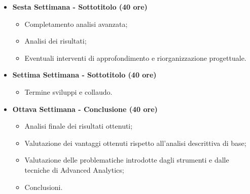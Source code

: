 {\begin{itemize}
\begin{itemize}
        \end{itemize}
        \item \textbf{Sesta Settimana - Sottotitolo (40 ore)} 
        \begin{itemize}
            \item Completamento analisi avanzata;
            \item Analisi dei risultati;
            \item Eventuali interventi di approfondimento e riorganizzazione progettuale.
        \end{itemize}
        \item \textbf{Settima Settimana - Sottotitolo (40 ore)} 
        \begin{itemize}
            \item Termine sviluppi e collaudo.
        \end{itemize}
        \item \textbf{Ottava Settimana - Conclusione (40 ore)} 
        \begin{itemize}
            \item Analisi finale dei risultati ottenuti;
            \item Valutazione dei vantaggi ottenuti rispetto all'analisi descrittiva di base;
            \item Valutazione delle problematiche introdotte dagli strumenti e dalle tecniche di Advanced Analytics;
            \item Conclusioni.
        \end{itemize}
    \end{itemize}
}

\newcommand{\totaleOre}{}

\newcommand{\obiettiviObbligatori}{
	 \item \underline{\textit{O01}}: primo obiettivo;
	 \item \underline{\textit{O02}}: secondo obiettivo;
	 \item \underline{\textit{O03}}: terzo obiettivo;
	 
}

\newcommand{\obiettiviDesiderabili}{
	 \item \underline{\textit{D01}}: primo obiettivo;
	 \item \underline{\textit{D02}}: secondo obiettivo;
}

\newcommand{\obiettiviFacoltativi}{
	 \item \underline{\textit{F01}}: primo obiettivo;
	 \item \underline{\textit{F02}}: secondo obiettivo;
	 \item \underline{\textit{F03}}: terzo obiettivo;
}